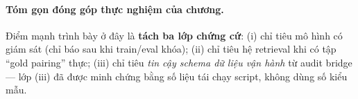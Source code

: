 \paragraph{Tóm gọn đóng góp thực nghiệm của chương.}
Điểm mạnh trình bày ở đây là \textbf{tách ba lớp chứng cứ}: (i) chỉ tiêu mô hình có giám sát (chỉ báo sau khi train/eval khóa); (ii) chỉ tiêu hệ retrieval khi có tập ``gold pairing'' thực; (iii) chỉ tiêu \emph{tin cậy schema dữ liệu vận hành} từ audit bridge --- lớp (iii) đã được minh chứng bằng số liệu tái chạy script, không dùng số kiểu mẫu.

